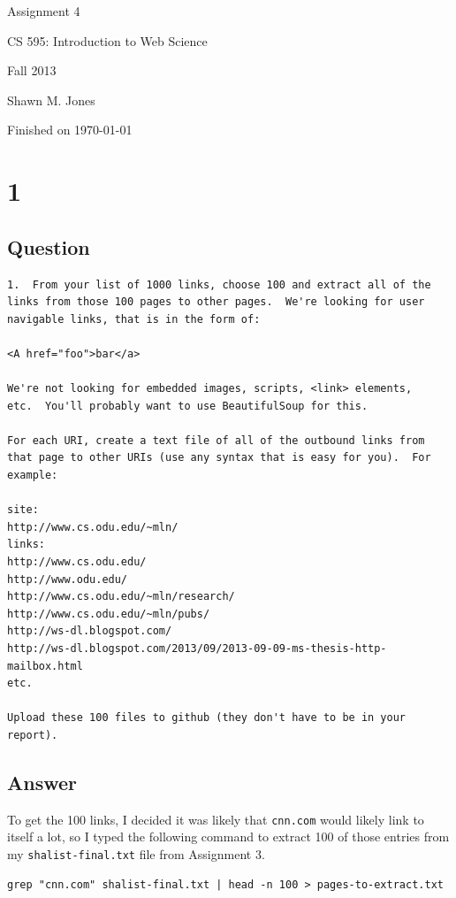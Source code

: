 \documentclass[letterpaper,11pt]{article}
\begin{document}
\begin{titlepage}

\begin{center}

\Huge{Assignment 4}

\Large{CS 595:  Introduction to Web Science}

\Large{Fall 2013}

\Large{Shawn M. Jones}

\Large Finished on \today

\end{center}

\end{titlepage}

\newpage
\section*{1}

\subsection*{Question}

\begin{verbatim}
1.  From your list of 1000 links, choose 100 and extract all of the
links from those 100 pages to other pages.  We're looking for user 
navigable links, that is in the form of: 

<A href="foo">bar</a>

We're not looking for embedded images, scripts, <link> elements,
etc.  You'll probably want to use BeautifulSoup for this.

For each URI, create a text file of all of the outbound links from
that page to other URIs (use any syntax that is easy for you).  For
example:

site: 
http://www.cs.odu.edu/~mln/    
links:
http://www.cs.odu.edu/
http://www.odu.edu/
http://www.cs.odu.edu/~mln/research/
http://www.cs.odu.edu/~mln/pubs/
http://ws-dl.blogspot.com/
http://ws-dl.blogspot.com/2013/09/2013-09-09-ms-thesis-http-mailbox.html
etc.

Upload these 100 files to github (they don't have to be in your report).
\end{verbatim}

\newpage
\subsection*{Answer}

To get the 100 links, I decided it was likely that \verb+cnn.com+ would likely link to itself a lot, so I typed the following command to extract 100 of those entries from my \verb+shalist-final.txt+ file from Assignment 3.
\begin{lstlisting}[frame=single,basicstyle=\tiny]
grep "cnn.com" shalist-final.txt | head -n 100 > pages-to-extract.txt
\end{lstlisting}
\end{document}
